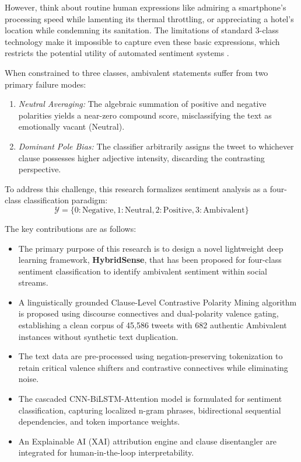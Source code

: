 \documentclass[conference]{IEEEtran}
\begin{document}
However, think about routine human expressions like admiring a smartphone's processing speed while lamenting its thermal throttling, or appreciating a hotel's location while condemning its sanitation. The limitations of standard 3-class technology make it impossible to capture even these basic expressions, which restricts the potential utility of automated sentiment systems \cite{mikolov2013distributed}.

When constrained to three classes, ambivalent statements suffer from two primary failure modes:
\begin{enumerate}
    \item \textit{Neutral Averaging:} The algebraic summation of positive and negative polarities yields a near-zero compound score, misclassifying the text as emotionally vacant (Neutral).
    \item \textit{Dominant Pole Bias:} The classifier arbitrarily assigns the tweet to whichever clause possesses higher adjective intensity, discarding the contrasting perspective.
\end{enumerate}

To address this challenge, this research formalizes sentiment analysis as a four-class classification paradigm:
\begin{equation}
\mathcal{Y} = \{0: \text{Negative}, 1: \text{Neutral}, 2: \text{Positive}, 3: \text{Ambivalent}\}
\end{equation}

The key contributions are as follows:
\begin{itemize}
    \item The primary purpose of this research is to design a novel lightweight deep learning framework, \textbf{HybridSense}, that has been proposed for four-class sentiment classification to identify ambivalent sentiment within social streams.
    \item A linguistically grounded Clause-Level Contrastive Polarity Mining algorithm is proposed using discourse connectives and dual-polarity valence gating, establishing a clean corpus of 45,586 tweets with 682 authentic Ambivalent instances without synthetic text duplication.
    \item The text data are pre-processed using negation-preserving tokenization to retain critical valence shifters and contrastive connectives while eliminating noise.
    \item The cascaded CNN-BiLSTM-Attention model is formulated for sentiment classification, capturing localized n-gram phrases, bidirectional sequential dependencies, and token importance weights.
    \item An Explainable AI (XAI) attribution engine and clause disentangler are integrated for human-in-the-loop interpretability.
\end{itemize}
\end{document}

